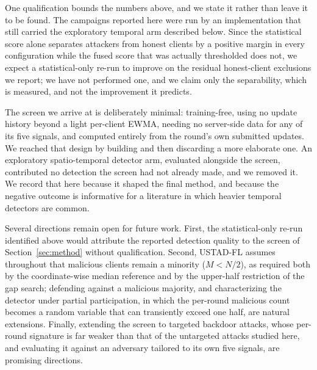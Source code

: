 \documentclass[journal]{IEEEtran}
\begin{document}
One qualification bounds the numbers above, and we state it rather than leave it to be found. The campaigns reported here were run by an implementation that still carried the exploratory temporal arm described below. Since the statistical score alone separates attackers from honest clients by a positive margin in every configuration while the fused score that was actually thresholded does not, we expect a statistical-only re-run to improve on the residual honest-client exclusions we report; we have not performed one, and we claim only the separability, which is measured, and not the improvement it predicts.

The screen we arrive at is deliberately minimal: training-free, using no update history beyond a light per-client EWMA, needing no server-side data for any of its five signals, and computed entirely from the round's own submitted updates. We reached that design by building and then discarding a more elaborate one. An exploratory spatio-temporal detector arm, evaluated alongside the screen, contributed no detection the screen had not already made, and we removed it. We record that here because it shaped the final method, and because the negative outcome is informative for a literature in which heavier temporal detectors are common.

Several directions remain open for future work. First, the statistical-only re-run identified above would attribute the reported detection quality to the screen of Section~\ref{sec:method} without qualification. Second, USTAD-FL assumes throughout that malicious clients remain a minority ($M < N/2$), as required both by the coordinate-wise median reference and by the upper-half restriction of the gap search; defending against a malicious majority, and characterizing the detector under partial participation, in which the per-round malicious count becomes a random variable that can transiently exceed one half, are natural extensions. Finally, extending the screen to targeted backdoor attacks, whose per-round signature is far weaker than that of the untargeted attacks studied here, and evaluating it against an adversary tailored to its own five signals, are promising directions.
\end{document}
